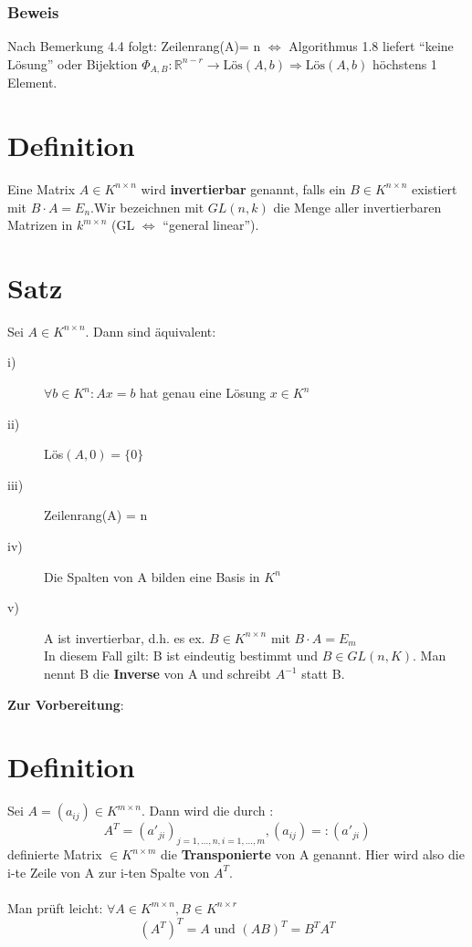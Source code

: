 \documentclass{scrbook}
\begin{document}
\subsubsection*{Beweis}
Nach Bemerkung 4.4 folgt: Zeilenrang(A)= n $\Leftrightarrow$ Algorithmus 1.8 liefert "`keine Lösung"' oder Bijektion $\Phi_{A,B}:\mathbb{R}^{n-r} \rightarrow \text{Lös}(A,b) \Rightarrow \text{Lös}(A,b)$ höchstens 1 Element.
\section{Definition}
Eine Matrix $A\in K^{n \times n}$ wird \textbf{invertierbar} genannt, falls ein $B \in K^{n\times n}$ existiert mit $B\cdot A = E_n$.Wir bezeichnen mit $GL(n,k)$ die Menge aller invertierbaren Matrizen in $k^{m\times n}$ (GL $\Leftrightarrow$ "`general linear"').
\section{Satz}
Sei $A\in K^{n\times n}$. Dann sind äquivalent:
\begin{description}
\item[i)] $\forall b \in K^n: Ax=b$ hat genau eine Lösung $x\in K^n$
\item[ii)] Lös$(A,0) = \{0\}$
\item[iii)] Zeilenrang(A) = n
\item[iv)] Die Spalten von A bilden eine Basis in $K^n$
\item[v)] A ist invertierbar, d.h. es ex. $B \in K^{n\times n}$  mit $B\cdot A = E_m$\\In diesem Fall gilt: B ist eindeutig bestimmt und $B \in GL(n,K)$. Man nennt B die \textbf{Inverse} von A und schreibt $A^{-1}$ statt B.
\end{description}
\textbf{Zur Vorbereitung}:
\section{Definition}
Sei $A=(a_{ij}) \in K^{m \times n}$. Dann wird die durch :\[
A^T=(a'_{ji})_{j=1,...,n,i=1,...,m},(a_{ij}) =: (a'_{ji})
\]
definierte Matrix $\in K^{n\times m}$ die \textbf{Transponierte} von A genannt. Hier wird also die i-te Zeile von A zur i-ten Spalte von $A^T$.\\
\\
Man prüft leicht: $\forall A \in K^{m \times n} , B \in K^{n \times r}$
\[
(A^T)^T = A \text{ und } (AB)^T = B^T A^T
\]
\end{document}
